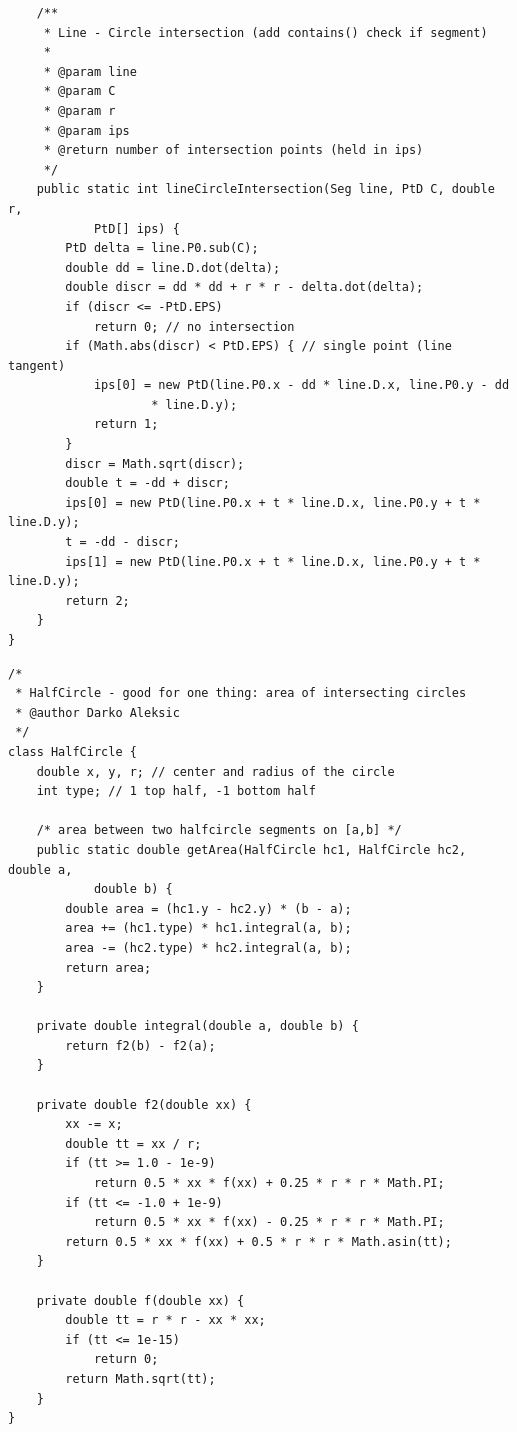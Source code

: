 \documentclass{article}
\begin{document}
    \begin{verbatim}
    /**
     * Line - Circle intersection (add contains() check if segment)
     * 
     * @param line
     * @param C
     * @param r
     * @param ips
     * @return number of intersection points (held in ips)
     */
    public static int lineCircleIntersection(Seg line, PtD C, double r,
            PtD[] ips) {
        PtD delta = line.P0.sub(C);
        double dd = line.D.dot(delta);
        double discr = dd * dd + r * r - delta.dot(delta);
        if (discr <= -PtD.EPS)
            return 0; // no intersection
        if (Math.abs(discr) < PtD.EPS) { // single point (line tangent)
            ips[0] = new PtD(line.P0.x - dd * line.D.x, line.P0.y - dd
                    * line.D.y);
            return 1;
        }
        discr = Math.sqrt(discr);
        double t = -dd + discr;
        ips[0] = new PtD(line.P0.x + t * line.D.x, line.P0.y + t * line.D.y);
        t = -dd - discr;
        ips[1] = new PtD(line.P0.x + t * line.D.x, line.P0.y + t * line.D.y);
        return 2;
    }
}

    \end{verbatim}
    \begin{verbatim}
/*
 * HalfCircle - good for one thing: area of intersecting circles
 * @author Darko Aleksic
 */
class HalfCircle {
    double x, y, r; // center and radius of the circle
    int type; // 1 top half, -1 bottom half

    /* area between two halfcircle segments on [a,b] */
    public static double getArea(HalfCircle hc1, HalfCircle hc2, double a,
            double b) {
        double area = (hc1.y - hc2.y) * (b - a);
        area += (hc1.type) * hc1.integral(a, b);
        area -= (hc2.type) * hc2.integral(a, b);
        return area;
    }

    private double integral(double a, double b) {
        return f2(b) - f2(a);
    }

    private double f2(double xx) {
        xx -= x;
        double tt = xx / r;
        if (tt >= 1.0 - 1e-9)
            return 0.5 * xx * f(xx) + 0.25 * r * r * Math.PI;
        if (tt <= -1.0 + 1e-9)
            return 0.5 * xx * f(xx) - 0.25 * r * r * Math.PI;
        return 0.5 * xx * f(xx) + 0.5 * r * r * Math.asin(tt);
    }

    private double f(double xx) {
        double tt = r * r - xx * xx;
        if (tt <= 1e-15)
            return 0;
        return Math.sqrt(tt);
    }
}
    \end{verbatim}
    \clearpage
\end{document}
